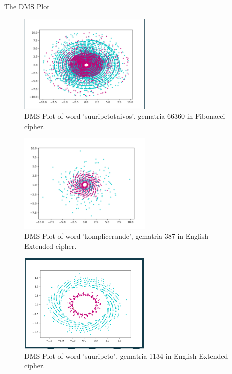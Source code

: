 \documentclass[a4paper,10pt]{article}
\begin{document}
\begin{section}{The DMS Plot}
     \begin{figure}
       \centering
       \includegraphics[width = 240px, height = 180px]{suuripetotaivos66360}
       \caption{DMS Plot of word 'suuripetotaivos', gematria 66360 in Fibonacci cipher.}
     \end{figure}

     \begin{figure}
       \centering
       \includegraphics[width = 240px, height = 180px]{komplicerande387}
       \caption{DMS Plot of word 'komplicerande', gematria 387 in English Extended cipher.}
     \end{figure}

     \begin{figure}
       \centering
       \includegraphics[width = 240px, height = 180px]{suuripeto1134}
       \caption{DMS Plot of word 'suuripeto', gematria 1134 in English Extended cipher.}
     \end{figure}
     
   \end{section}
   

   
\end{document}
